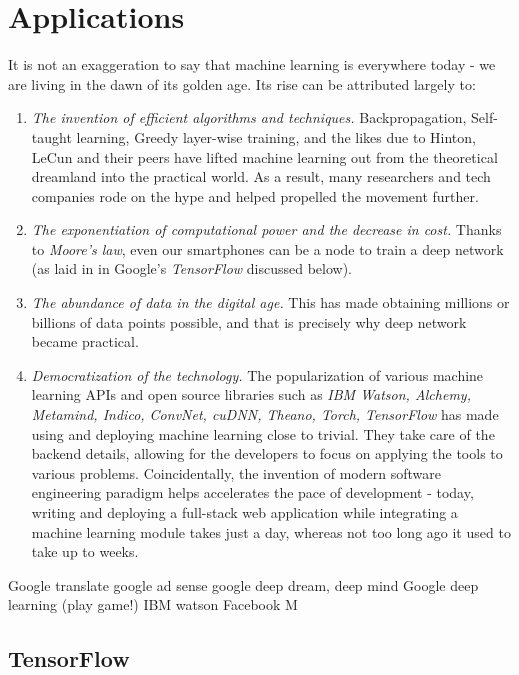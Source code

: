 \documentclass[12pt]{article}  %
\begin{document}
\section{Applications}
It is not an exaggeration to say that machine learning is everywhere today - we are living in the dawn of its golden age. Its rise can be attributed largely to:

\begin{enumerate}
	\item \emph{The invention of efficient algorithms and techniques.} Backpropagation, Self-taught learning, Greedy layer-wise training, and the likes due to Hinton, LeCun and their peers have lifted machine learning out from the theoretical dreamland into the practical world. As a result, many researchers and tech companies rode on the hype and helped propelled the movement further.
	\item \emph{The exponentiation of computational power and the decrease in cost.} Thanks to \emph{Moore's law}, even our smartphones can be a node to train a deep network (as laid in in Google's \emph{TensorFlow} discussed below).
	\item \emph{The abundance of data in the digital age.} This has made obtaining millions or billions of data points possible, and that is precisely why deep network became practical.
	\item \emph{Democratization of the technology.} The popularization of various machine learning APIs and open source libraries such as \emph{IBM Watson, Alchemy, Metamind, Indico, ConvNet, cuDNN, Theano, Torch, TensorFlow} has made using and deploying machine learning close to trivial. They take care of the backend details, allowing for the developers to focus on applying the tools to various problems. Coincidentally, the invention of modern software engineering paradigm helps accelerates the pace of development - today, writing and deploying a full-stack web application while integrating a machine learning module takes just a day, whereas not too long ago it used to take up to weeks.
\end{enumerate}




Google translate
google ad sense
google deep dream, deep mind
Google deep learning (play game!)
IBM watson
Facebook M

\subsection{TensorFlow}
\end{document}
